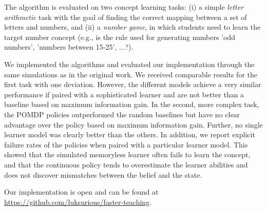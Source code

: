The algorithm is evaluated on two concept learning tasks: (i) a simple \textit{letter arithmetic} task with the goal of finding the correct mapping between a set of letters and numbers, and (ii) a \textit{number game}, in which students need to learn the target number concept (e.g., is the rule used for generating numbers 'odd numbers', 'numbers between 15-25', ...?). 


We implemented the algorithms and evaluated our implementation through the same simulations as in the original work.
We received comparable results for the first task with one deviation.
However, the different models achieve a very similar performance if paired with a sophisticated learner and are not better than a baseline based on maximum information gain. 
In the second, more complex task, the POMDP policies outperformed the random baselines but have no clear advantage over the policy based on maximum information gain. Further, no single learner model was clearly better than the others.
In addition, we report explicit failure rates of the policies when paired with a particular learner model. This showed that the simulated memoryless learner often fails to learn the concept, and that the continuous policy tends to overestimate the learner abilities and does not discover mismatches between the belief and the state.


Our implementation is open and can be found at \url{https://github.com/luksurious/faster-teaching}.

